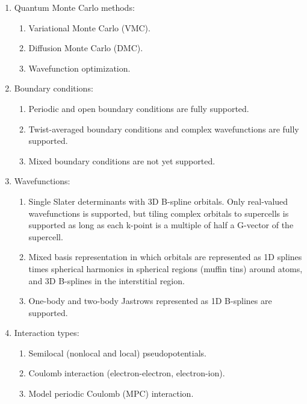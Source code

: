 \begin{enumerate}

  \item Quantum Monte Carlo methods:

    \begin{enumerate}
	\item Variational Monte Carlo (VMC).
	\item Diffusion Monte Carlo (DMC).
	\item Wavefunction optimization.
    \end{enumerate}

  \item Boundary conditions:

    \begin{enumerate}
	\item Periodic and open boundary conditions are fully supported.
	\item Twist-averaged boundary conditions and complex wavefunctions are fully supported.
	\item Mixed boundary conditions are not yet supported.
    \end{enumerate}

  \item Wavefunctions:

    \begin{enumerate}
	\item Single Slater determinants with 3D B-spline orbitals. Only real-valued wavefunctions is supported, but tiling complex orbitals to supercells is supported as long as each k-point is a multiple of half a G-vector of the supercell.
	\item Mixed basis representation in which orbitals are represented as 1D splines times spherical harmonics in spherical regions (muffin tins) around atoms, and 3D B-splines in the interstitial region.
	\item One-body and two-body Jastrows represented as 1D B-splines are supported. %
    \end{enumerate}

  \item Interaction types:

    \begin{enumerate}
	\item Semilocal (nonlocal and local) pseudopotentials.
	\item Coulomb interaction (electron-electron, electron-ion).
	\item Model periodic Coulomb (MPC) interaction.
    \end{enumerate}

\end{enumerate}

